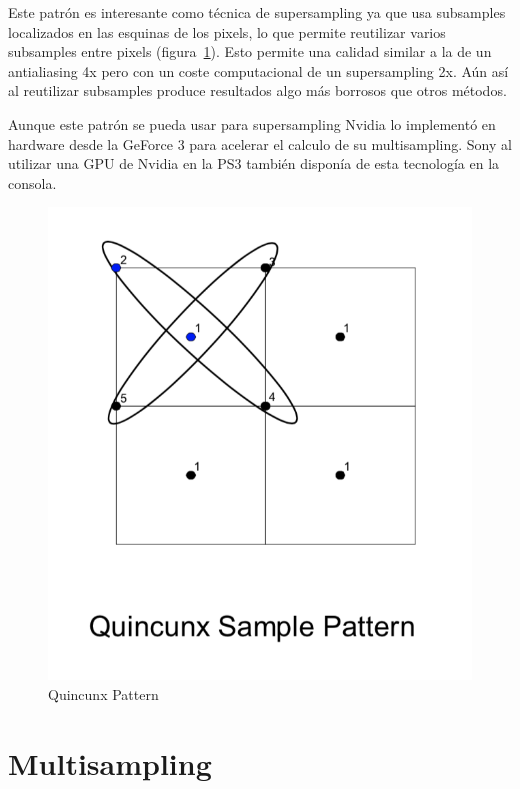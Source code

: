\documentclass[withindex, glossary]{cam-thesis}
\begin{document}
Este patrón es interesante como técnica de supersampling ya que usa subsamples localizados en las esquinas de los pixels, lo que permite reutilizar varios subsamples entre pixels (figura~\ref{fig:quincunx}). Esto permite una calidad similar a la de un antialiasing 4x pero con un coste computacional de un supersampling 2x. Aún así al reutilizar subsamples produce resultados algo más borrosos que otros métodos.

Aunque este patrón se pueda usar para supersampling Nvidia lo implementó en hardware desde la GeForce 3\cite{hraa} para acelerar el calculo de su multisampling. Sony al utilizar una GPU de Nvidia en la PS3 también disponía de esta tecnología en la consola.

\begin{figure}[!htb]
    \includegraphics[width=\linewidth]{figures/quincunx.png}
    \caption{Quincunx Pattern\cite{hraa}}
    \label{fig:quincunx}
\end{figure}

\section{Multisampling}
\end{document}
